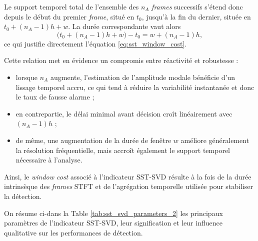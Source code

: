 \documentclass[12pt,a4paper, openany]{book}
\begin{document}
Le support temporel total de l'ensemble des $n_A$ \textit{frames} successifs s'étend donc depuis le début du premier \textit{frame}, situé en $t_0$, jusqu'à la fin du dernier, située en $t_0 + (n_A-1)h + w$. La durée correspondante vaut alors
\begin{equation}
\bigl(t_0 + (n_A-1)h + w\bigr) - t_0 = w + (n_A-1)h,
\end{equation}
ce qui justifie directement l'équation \eqref{eq:sst_window_cost}.
\medskip

Cette relation met en évidence un compromis entre réactivité et robustesse :
\begin{itemize}
    \item lorsque $n_A$ augmente, l'estimation de l'amplitude modale bénéficie d'un lissage temporel accru, ce qui tend à réduire la variabilité instantanée et donc le taux de fausse alarme ;
    \item en contrepartie, le délai minimal avant décision croît linéairement avec $(n_A-1)h$ ;
    \item de même, une augmentation de la durée de fenêtre $w$ améliore généralement la résolution fréquentielle, mais accroît également le support temporel nécessaire à l'analyse.
\end{itemize}
\medskip

Ainsi, le \textit{window cost} associé à l'indicateur SST-SVD résulte à la fois de la durée intrinsèque des \textit{frames} STFT et de l'agrégation temporelle utilisée pour stabiliser la détection.
\medskip


On résume ci-dans la Table \ref{tab:sst_svd_parameters_2} les principaux paramètres de l'indicateur SST-SVD, leur signification et leur influence qualitative sur les performances de détection.
\end{document}
